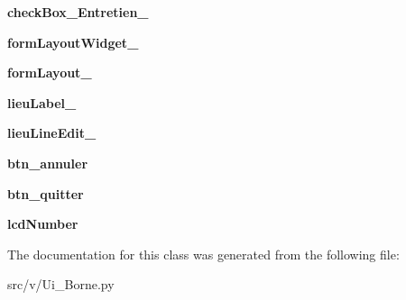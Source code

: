 \begin{DoxyCompactItemize}
\item 
\hypertarget{classv_1_1_ui___borne_1_1_ui___borne_af1f7147821f60265b9109ca98360e110}{}{\bfseries check\+Box\+\_\+\+Entretien\+\_}\label{classv_1_1_ui___borne_1_1_ui___borne_af1f7147821f60265b9109ca98360e110}

\item 
\hypertarget{classv_1_1_ui___borne_1_1_ui___borne_ad31bc4df9b964cbec0fa231c2f7d50aa}{}{\bfseries form\+Layout\+Widget\+\_}\label{classv_1_1_ui___borne_1_1_ui___borne_ad31bc4df9b964cbec0fa231c2f7d50aa}

\item 
\hypertarget{classv_1_1_ui___borne_1_1_ui___borne_a63745bac390d799ea366f4928e73547a}{}{\bfseries form\+Layout\+\_}\label{classv_1_1_ui___borne_1_1_ui___borne_a63745bac390d799ea366f4928e73547a}

\item 
\hypertarget{classv_1_1_ui___borne_1_1_ui___borne_a48ff064ba9fc43ccc9c5427f963a83ae}{}{\bfseries lieu\+Label\+\_}\label{classv_1_1_ui___borne_1_1_ui___borne_a48ff064ba9fc43ccc9c5427f963a83ae}

\item 
\hypertarget{classv_1_1_ui___borne_1_1_ui___borne_a63b90b65df13b04d89d90e311fbfa126}{}{\bfseries lieu\+Line\+Edit\+\_}\label{classv_1_1_ui___borne_1_1_ui___borne_a63b90b65df13b04d89d90e311fbfa126}

\item 
\hypertarget{classv_1_1_ui___borne_1_1_ui___borne_a9dad253b85b7f556aef7e91d88e3cc21}{}{\bfseries btn\+\_\+annuler}\label{classv_1_1_ui___borne_1_1_ui___borne_a9dad253b85b7f556aef7e91d88e3cc21}

\item 
\hypertarget{classv_1_1_ui___borne_1_1_ui___borne_a193894c86ac4763907eed18dbf64147f}{}{\bfseries btn\+\_\+quitter}\label{classv_1_1_ui___borne_1_1_ui___borne_a193894c86ac4763907eed18dbf64147f}

\item 
\hypertarget{classv_1_1_ui___borne_1_1_ui___borne_ac7b5afad10352409944b291d59f15be4}{}{\bfseries lcd\+Number}\label{classv_1_1_ui___borne_1_1_ui___borne_ac7b5afad10352409944b291d59f15be4}

\end{DoxyCompactItemize}


The documentation for this class was generated from the following file\+:\begin{DoxyCompactItemize}
\item 
src/v/Ui\+\_\+\+Borne.\+py\end{DoxyCompactItemize}
